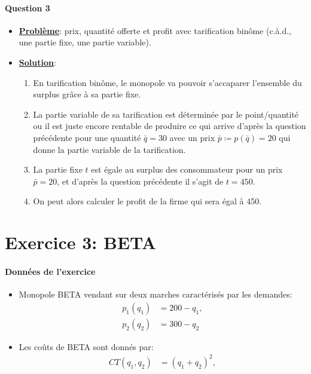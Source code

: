 \documentclass[notes, ignorenonframetext, compress, 9pt, xcolor=svgnames, aspectratio=169]{beamer}
\begin{document}
      \begin{frame}
        [allowframebreaks]{\insertsection}
        \framesubtitle{Question 3\\}
        \begin{itemize}
          \item \textbf{\underline{Problème}}:  prix, quantité offerte et profit avec  tarification binôme
           (c.à.d., une partie fixe, une partie variable).

    \item \textbf{\underline{Solution}}: 
  \begin{enumerate}[$\cdot$]
   \item En tarification binôme, le monopole va pouvoir s’accaparer l’ensemble du surplus grâce à sa partie fixe.
   \item La partie variable de sa tarification est déterminée par le point/quantité ou il est juste encore rentable de 
   produire ce qui arrive d'après la question précédente pour une quantité $\bar{q} = 30$ avec un prix $\bar{p}\coloneqq p(\bar{q}) = 20$ 
   qui donne la partie variable de la tarification.
   \item La partie fixe $t$ est égale au surplus des consommateur pour un prix $\bar{p} = 20$, et d'après la question précédente il s'agit de $t = 450$. 
   \item On peut alors calculer le profit de la firme qui sera égal à 450.
  \end{enumerate}
\end{itemize}
  \end{frame}
   
  \section{Exercice 3: BETA }
\frame{\sectionpage}
\begin{frame}
[allowframebreaks]{\insertsection}
\framesubtitle{Données de l'exercice \\}
\begin{itemize}
    \item Monopole BETA vendant sur deux marches caractérisés par les demandes:
    \begin{align}
   p_1(q_1) & = 200-q_1,\\
   p_2(q_2) & = 300-q_2
    \label{eq7}
    \end{align}
   \item Les coûts de BETA sont donnés par:
   \begin{align}
     CT(q_1, q_2)&=(q_1+q_2)^2,
     \label{eq8}
   \end{align}
\end{itemize}
    \end{frame}
\end{document}

